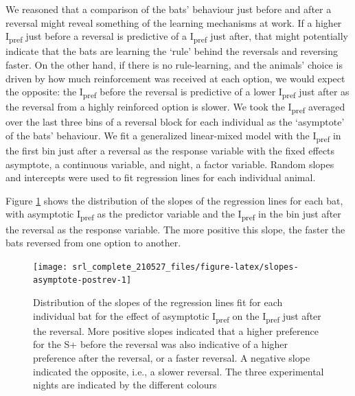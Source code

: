 \documentclass[
]{article}
\begin{document}
We reasoned that a comparison of the bats' behaviour just before and after a reversal might reveal something of the learning mechanisms at work. If a higher I\textsubscript{pref} just before a reversal is predictive of a I\textsubscript{pref} just after, that might potentially indicate that the bats are learning the `rule' behind the reversals and reversing faster. On the other hand, if there is no rule-learning, and the animals' choice is driven by how much reinforcement was received at each option, we would expect the opposite: the I\textsubscript{pref} before the reversal is predictive of a lower I\textsubscript{pref} just after as the reversal from a highly reinforced option is slower. We took the I\textsubscript{pref} averaged over the last three bins of a reversal block for each individual as the `asymptote' of the bats' behaviour. We fit a generalized linear-mixed model with the I\textsubscript{pref} in the first bin just after a reversal as the response variable with the fixed effects asymptote, a continuous variable, and night, a factor variable. Random slopes and intercepts were used to fit regression lines for each individual animal.

Figure \ref{fig:slopes-asymptote-postrev} shows the distribution of the slopes of the regression lines for each bat, with asymptotic I\textsubscript{pref} as the predictor variable and the I\textsubscript{pref} in the bin just after the reversal as the response variable. The more positive this slope, the faster the bats reversed from one option to another.



\begin{figure}[H]

{\centering \texttt{[image: srl\_complete\_210527\_files/figure-latex/slopes-asymptote-postrev-1]} 

}

\caption{Distribution of the slopes of the regression lines fit for each individual bat for the effect of asymptotic I\textsubscript{pref} on the I\textsubscript{pref} just after the reversal. More positive slopes indicated that a higher preference for the S+ before the reversal was also indicative of a higher preference after the reversal, or a faster reversal. A negative slope indicated the opposite, i.e., a slower reversal. The three experimental nights are indicated by the different colours}\label{fig:slopes-asymptote-postrev}
\end{figure}
\end{document}
